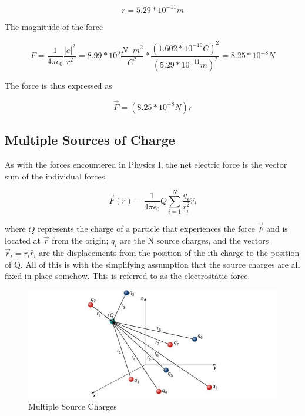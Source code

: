 \documentclass[14pt]{memoir}
\begin{document}
\begin{equation}
r = 5.29 * 10^{-11} m
\end{equation}

The magnitude of the force

\begin{equation}
F = \frac{1}{4 \pi \epsilon_0} \frac{\lvert e \lvert^2}{r^{2}} = 8.99 * 10^9 \frac{N \cdot m^2}{C^2} * \frac{(1.602 * 10^{-19} C)^2}{(5.29 * 10^{-11} m)^2} = 8.25 * 10^{-8} N
\end{equation}

The force is thus expressed as

\begin{equation}
\vec{F} = (8.25 * 10^{-8} N) \hat{r}
\end{equation}

\subsection{Multiple Sources of Charge}

As with the forces encountered in Physics I, the net electric force is the vector sum of the individual forces. 

\begin{equation}
\vec{F}(r) = \frac{1}{4 \pi \epsilon_0} Q \sum_{i=1}^{N}\frac{q_i}{r_i^2}\hat{r}_i
\end{equation}

where $Q$ represents the charge of a particle that experiences the force $\vec{F}$ and is located at $\vec{r}$ from the origin; $q_i$ are the N source charges, and the vectors $\vec{r}_i = r_i \hat{r}_i$ are the displacements from the position of the ith charge to the position of Q. All of this is with the simplifying assumption that the source charges are all fixed in place somehow. This is referred to as the electrostatic force. 

\begin{figure}[h]
\begin{center}
\includegraphics[scale=0.60]{fig/fig_05_15.jpg}
\caption{Multiple Source Charges}
\label{fig:05_15}
\end{center}
\end{figure}
\end{document}
